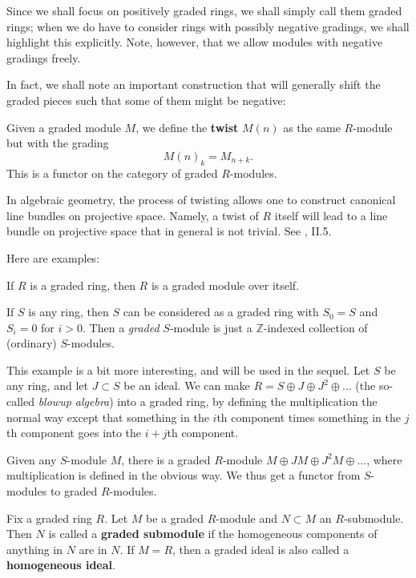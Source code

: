 Since we shall focus on positively graded rings, we shall simply call them
graded rings; when we do have to consider rings with possibly negative
gradings, we shall highlight this explicitly. Note, however, that we allow
modules with negative gradings freely.

In fact, we shall note an important construction that will generally shift
the graded pieces such that some of them might be negative:

\begin{definition} 
Given a graded module $M$, we define the \textbf{twist} $M(n)$ as the
same $R$-module but with the grading
\[  M(n)_k = M_{n+k} . \]  
This is a functor on the category of graded $R$-modules.
\end{definition} 

In algebraic geometry, the process of twisting allows one to construct
canonical line bundles on projective space. Namely, a twist of $R$ itself
will lead to a line bundle on projective space that in general is not
trivial. See \cite{Ha77}, II.5.

Here are examples:
\begin{example} 
If $R$ is  a graded ring, then $R$ is a graded module over itself. 
\end{example} 

\begin{example}
If $S$ is any ring, then $S$ can be considered as a graded ring with $S_0 = S$
and $S_i = 0$ for $i>0$. Then a \emph{graded} $S$-module is just a
$\mathbb{Z}$-indexed collection of (ordinary) $S$-modules.
\end{example} 

\begin{example}
This example is a bit more interesting, and will be used in the sequel. Let $S$
be any ring, and let $J \subset S$ be an ideal. We can make $R = S \oplus J \oplus
J^2 \oplus \dots$ (the so-called \emph{blowup algebra}) into a graded ring, by defining the multiplication the normal
way except that something in the $i$th component times something in the $j$th
component goes into the $i+j$th component. 

Given any $S$-module $M$, there is a graded $R$-module $M \oplus JM \oplus J^2
M \oplus \dots$, where multiplication is defined in the obvious way. We thus
get a functor from $S$-modules to graded $R$-modules. 	
\end{example} 

\begin{definition} Fix a graded ring $R$.
Let $M$ be a graded $R$-module and $N \subset M$ an $R$-submodule. Then $N$ is
called a
\textbf{graded submodule} if the homogeneous components of anything in $N$ are
in $N$. If $M=R$, then a graded ideal is also called a \textbf{homogeneous
ideal}.
\end{definition} 

